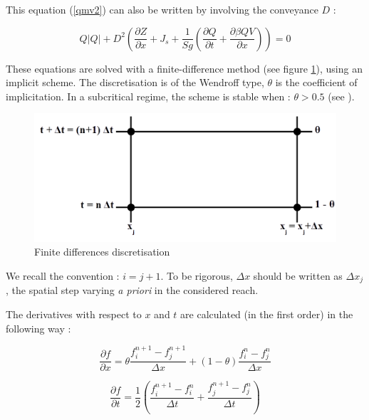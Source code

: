 This equation (\ref{qmv2}) can also be written by involving the conveyance $D$ :

\begin{equation}
  Q |Q| + D^2 \left ( \frac{\partial Z}{\partial x} +J_s + \frac{1}{S g} \left ( \frac{\partial Q}{\partial t} + \frac{\partial \beta Q V}{\partial x}\right ) \right ) = 0
\end{equation}

These equations are solved with a finite-difference method (see figure \ref{fig:DF}), using an implicit scheme. The discretisation is of the Wendroff type, $\theta$ is the coefficient of implicitation. In a subcritical regime, the scheme is stable when : $\theta > 0.5$ (see \cite{CUNGE64}).

\begin{figure}[H]
 \begin{center}
  \includegraphics[width=\textwidth]{Figures/Disc_DF.png}
  \caption{Finite differences discretisation}
  \label{fig:DF}
 \end{center}
\end{figure}

We recall the convention : $i = j + 1$. To be rigorous, $\Delta x$ should be written as $\Delta x_j$, the spatial step varying \textit{a priori} in the considered reach.

The derivatives with respect to $x$ and $t$ are calculated (in the first order) in the following way :

\begin{equation}
  \frac{\partial f}{\partial x} = \theta \frac{f_{i}^{n+1}-f_{j}^{n+1}}{\Delta x} + (1-\theta) \frac{f_{i}^n - f_{j}^n}{\Delta x}
\end{equation}

\begin{equation}
  \frac{\partial f}{\partial t} = \frac{1}{2} \left ( \frac{f_{i}^{n+1} - f_{i}^n}{\Delta t} + \frac{f_{j}^{n+1} - f_{j}^n}{\Delta t} \right )
\end{equation}

